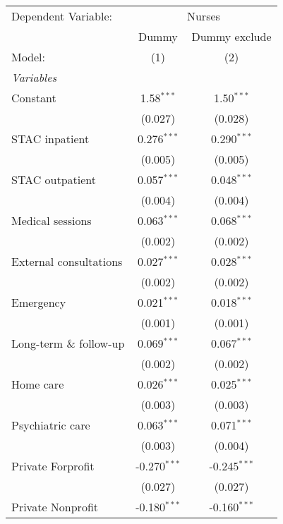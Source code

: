 
\begingroup
\centering
\begin{tabular}{lcc}
   \tabularnewline \midrule \midrule
   Dependent Variable: & \multicolumn{2}{c}{Nurses}\\
                           & Dummy          & Dummy exclude \\   
   Model:                  & (1)            & (2)\\  
   \midrule
   \emph{Variables}\\
   Constant                & 1.58$^{***}$   & 1.50$^{***}$\\   
                           & (0.027)        & (0.028)\\   
   STAC inpatient          & 0.276$^{***}$  & 0.290$^{***}$\\   
                           & (0.005)        & (0.005)\\   
   STAC outpatient         & 0.057$^{***}$  & 0.048$^{***}$\\   
                           & (0.004)        & (0.004)\\   
   Medical sessions        & 0.063$^{***}$  & 0.068$^{***}$\\   
                           & (0.002)        & (0.002)\\   
   External consultations  & 0.027$^{***}$  & 0.028$^{***}$\\   
                           & (0.002)        & (0.002)\\   
   Emergency               & 0.021$^{***}$  & 0.018$^{***}$\\   
                           & (0.001)        & (0.001)\\   
   Long-term \& follow-up  & 0.069$^{***}$  & 0.067$^{***}$\\   
                           & (0.002)        & (0.002)\\   
   Home care               & 0.026$^{***}$  & 0.025$^{***}$\\   
                           & (0.003)        & (0.003)\\   
   Psychiatric care        & 0.063$^{***}$  & 0.071$^{***}$\\   
                           & (0.003)        & (0.004)\\   
   Private Forprofit       & -0.270$^{***}$ & -0.245$^{***}$\\   
                           & (0.027)        & (0.027)\\   
   Private Nonprofit       & -0.180$^{***}$ & -0.160$^{***}$\\   

\end{tabular}
